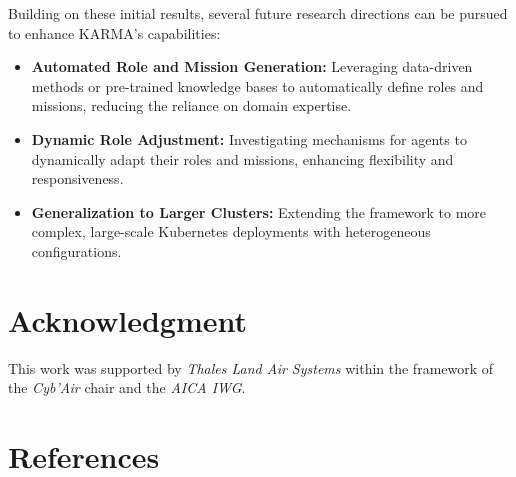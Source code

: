 \documentclass[conference]{IEEEtran}
\begin{document}
Building on these initial results, several future research directions can be pursued to enhance KARMA's capabilities:
\begin{itemize}
    \item \textbf{Automated Role and Mission Generation:} Leveraging data-driven methods or pre-trained knowledge bases to automatically define roles and missions, reducing the reliance on domain expertise.
    \item \textbf{Dynamic Role Adjustment:} Investigating mechanisms for agents to dynamically adapt their roles and missions, enhancing flexibility and responsiveness.
    \item \textbf{Generalization to Larger Clusters:} Extending the framework to more complex, large-scale Kubernetes deployments with heterogeneous configurations.
\end{itemize}


\section*{Acknowledgment}
    This work was supported by \emph{Thales Land Air Systems} within the framework of the \emph{Cyb'Air} chair and the \emph{AICA IWG}.

\section*{References}

\nocite{alDhuraibi2017elasticDocker}

% 



\end{document}
